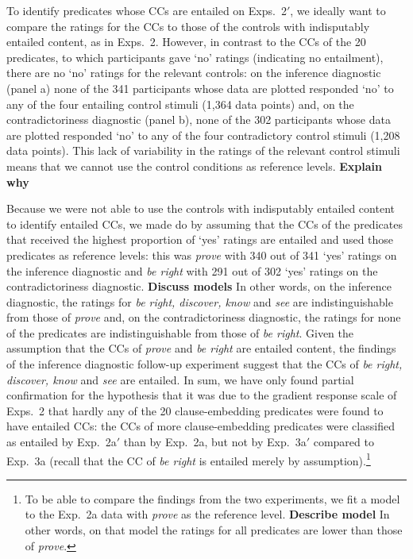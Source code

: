 \documentclass[11pt,fleqn]{article}
\newcommand{\6}{\mbox{$[\hspace*{-.6mm}[$}}
\newcommand{\9}{\mbox{$]\hspace*{-.6mm}]$}}
\begin{document}
{To identify predicates whose CCs are entailed on Exps.~2$'$, we ideally want to compare the ratings for the CCs to those of the controls with indisputably entailed content, as in Exps.~2. However, in contrast to the CCs of the 20 predicates, to which participants gave `no' ratings (indicating no entailment), there are no `no' ratings for the relevant controls: on the inference diagnostic (panel a) none of the 341 participants whose data are plotted responded `no' to any of the four entailing control stimuli (1,364 data points) and, on the contradictoriness diagnostic (panel b), none of the 302 participants whose data are plotted responded `no' to any of the four contradictory control stimuli (1,208 data points). This lack of variability in the ratings of the relevant control stimuli means that we cannot use the control conditions as reference levels. {\bf Explain why}

Because we were not able to use the controls with indisputably entailed content to identify entailed CCs, we made do by assuming that the CCs of the predicates that received the highest proportion of `yes' ratings are entailed and used those predicates as reference levels: this was {\em prove} with 340 out of 341 `yes' ratings on the inference diagnostic and {\em be right} with 291 out of 302 `yes' ratings on the contradictoriness diagnostic. {\bf Discuss models} In other words, on the inference diagnostic, the ratings for {\em be right, discover, know} and {\em see} are indistinguishable from those of {\em prove} and, on the contradictoriness diagnostic, the ratings for none of the predicates are indistinguishable from those of {\em be right}. Given the assumption that the CCs of {\em prove} and {\em be right} are entailed content, the findings of the inference diagnostic follow-up experiment suggest that the CCs of {\em be right, discover, know} and {\em see} are entailed. In sum, we have only found partial confirmation for the hypothesis that it was due to the gradient response scale of Exps.~2 that hardly any of the 20 clause-embedding predicates were found to have entailed CCs: the CCs of more clause-embedding predicates were classified as entailed by Exp.~2a$'$ than by Exp.~2a, but not by Exp.~3a$'$ compared to Exp.~3a (recall that the CC of {\em be right} is entailed merely by assumption).\footnote{To be able to compare the findings from the two experiments, we fit a model to the Exp.~2a data with {\em prove} as the reference level. {\bf Describe model} In other words, on that model the ratings for all predicates are lower than those of {\em prove}.} 

}
\end{document}
